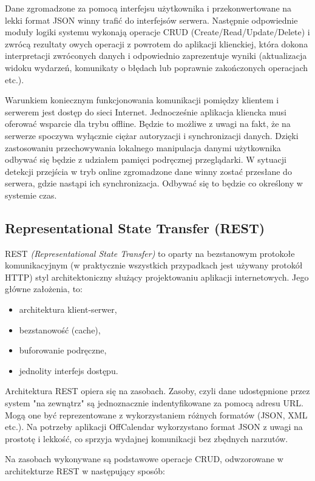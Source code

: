 Dane zgromadzone za pomocą interfejsu użytkownika i przekonwertowane na lekki format JSON winny trafić do interfejsów serwera. Następnie odpowiednie moduły logiki systemu wykonają operacje CRUD (Create/Read/Update/Delete) i zwrócą rezultaty owych operacji z powrotem do aplikacji klienckiej, która dokona interpretacji zwróconych danych i odpowiednio zaprezentuje wyniki (aktualizacja widoku wydarzeń, komunikaty o błędach lub poprawnie zakończonych operacjach etc.).

Warunkiem koniecznym funkcjonowania komunikacji pomiędzy klientem i serwerem jest dostęp do sieci Internet. Jednocześnie aplikacja kliencka musi oferować wsparcie dla trybu offline. Będzie to możliwe z uwagi na fakt, że na serwerze spoczywa wyłącznie ciężar autoryzacji i synchronizacji danych. Dzięki zastosowaniu przechowywania lokalnego manipulacja danymi użytkownika odbywać się będzie z udziałem pamięci podręcznej przeglądarki. W sytuacji detekcji przejścia w tryb online zgromadzone dane winny zostać przesłane do serwera, gdzie nastąpi ich synchronizacja. Odbywać się to będzie co określony w systemie czas.

\subsection{Representational State Transfer (REST)}
\label{sec:REST}

REST \emph{(Representational State Transfer)} to oparty na bezstanowym protokołe komunikacyjnym (w praktycznie wszystkich przypadkach jest używany protokół HTTP) styl architektoniczny służący projektowaniu aplikacji internetowych. Jego główne założenia, to:

\begin{itemize}
\item architektura klient-serwer,
\item bezstanowość (cache),
\item buforowanie podręczne,
\item jednolity interfejs dostępu.
\end{itemize}

Architektura REST opiera się na zasobach. Zasoby, czyli dane udostępnione przez system "na zewnątrz" są jednoznacznie indentyfikowane za pomocą adresu URL. Mogą one być reprezentowane z wykorzystaniem różnych formatów (JSON, XML etc.). Na potrzeby aplikacji OffCalendar wykorzystano format JSON z uwagi na prostotę i lekkość, co sprzyja wydajnej komunikacji bez zbędnych narzutów.

Na zasobach wykonywane są podstawowe operacje CRUD, odwzorowane w architekturze REST w następujący sposób:

